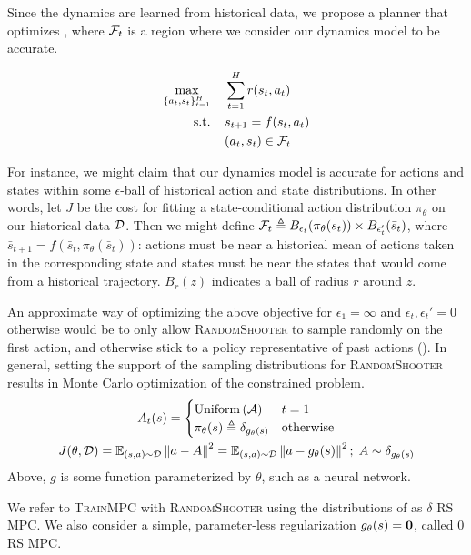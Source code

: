 \documentclass{article}
\begin{document}
Since the dynamics are learned from historical data, we propose a planner that optimizes , where $\mathcal{F}_t$ is a region where we consider our dynamics model to be accurate.

\begin{align}
    \max_{\{a_t,s_t\}_{t=1}^H}&\;\;\;\; \sum_{t=1}^H r(s_t, a_t) \label{eq:constrained}\\
  \text{s.t.} &\;\;\;\; s_{t+1} = f(s_t,a_t)\nonumber\\
      & \;\;\;\;(a_t,s_t)\in \mathcal{F}_t \nonumber
\end{align}

For instance, we might claim that our dynamics model is accurate for actions and states within some $\epsilon$-ball of historical action and state distributions. In other words, let $J$ be the cost for fitting a state-conditional action distribution $\pi_\theta$ on our historical data $\mathcal{D}$. Then we might define $\mathcal{F}_t\triangleq B_{\epsilon_t}(\pi_\theta(s_t))\times B_{\epsilon_t'}(\bar s_t)$, where $\bar s_{t+1}=f(\bar s_t, \pi_\theta (\bar s_t))$: actions must be near a historical mean of actions taken in the corresponding state and states must be near the states that would come from a historical trajectory. $B_r(z)$ indicates a ball of radius $r$ around $z$.

An approximate way of optimizing the above objective for $\epsilon_1=\infty$ and $\epsilon_t,\epsilon_t'=0$ otherwise would be to only allow \textsc{RandomShooter} to sample randomly on the first action, and otherwise stick to a policy representative of past actions (). In general, setting the support of the sampling distributions for \textsc{RandomShooter} results in Monte Carlo optimization of the constrained problem.
\begin{equation}\label{eq:delta}
  \begin{gathered}
  A_t(s)=\begin{cases}
\operatorname{Uniform}\left({\mathcal{A}}\right)    & t=1 \\
\pi_\theta(s)\triangleq\delta_{g_\theta(s)} & \text{otherwise}
\end{cases} \\
J(\theta,\mathcal{D})=\operatorname{\mathbb{E}}_{(s,a)\sim \mathcal{D}}\left\lVert a-A \right\rVert^2=\operatorname{\mathbb{E}}_{(s,a)\sim \mathcal{D}}\left\lVert a-g_\theta(s) \right\rVert^2;\;A\sim\delta_{g_\theta(s)}
\end{gathered}
\end{equation}
Above, $g$ is some function parameterized by $\theta$, such as a neural network.

We refer to \textsc{TrainMPC} with \textsc{RandomShooter} using the distributions of  as $\delta$ RS MPC. We also consider a simple, parameter-less regularization $g_\theta(s)=\textbf{0}$, called $0$ RS MPC.
\end{document}
